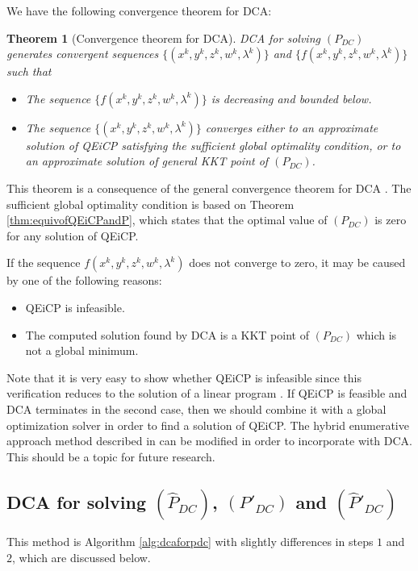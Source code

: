 \documentclass[3p]{elsarticle}
\newtheorem{thm}{Theorem}
\begin{document}
We have the following convergence theorem for DCA:
\begin{thm}[Convergence theorem for DCA]\label{thm:convergenceofdca}
	DCA for solving $(P_{DC})$ generates convergent sequences $\{(x^k,y^k,z^k,w^k,\lambda^k)\}$ and $\{f(x^k,y^k,z^k,w^k,\lambda^k)\}$ such that 
	\begin{itemize}
		\item[(i)] The sequence $\{f(x^k,y^k,z^k,w^k,\lambda^k)\}$ is decreasing and bounded below.
		\item[(ii)] The sequence $\{(x^k,y^k,z^k,w^k,\lambda^k)\}$ converges either to an approximate solution of QEiCP satisfying the sufficient global optimality condition, or to an approximate solution of general KKT point of $(P_{DC})$.
	\end{itemize}
\end{thm}
\begin{pf}
	This theorem is a consequence of the general convergence theorem for DCA \cite{Pham98,Pham05}. The sufficient global optimality condition is based on Theorem \ref{thm:equivofQEiCPandP}, which states that the optimal value of $(P_{DC})$ is zero for any solution of QEiCP.
\end{pf}
\begin{rmk}
	If the sequence $f(x^k,y^k,z^k,w^k,\lambda^k)$ does not converge to zero, it may be caused by one of the following reasons:
	\begin{itemize}
		\item[(i)] QEiCP is infeasible.
		\item[(ii)] The computed solution found by DCA is a KKT point of $(P_{DC})$ which is not a global minimum.
	\end{itemize}
	Note that it is very easy to show whether QEiCP is infeasible since this verification reduces to the solution of a linear program \cite{Cottle}. If QEiCP is feasible and DCA terminates in the second case, then we should combine it with a global optimization solver in order to find a solution of QEiCP. The hybrid enumerative approach method described in \cite{Iusem16} can be modified in order to incorporate with DCA. This should be a topic for future research.
\end{rmk}


\subsection{DCA for solving $(\hat{P}_{DC})$, $(P'_{DC})$ and $(\hat{P}'_{DC})$}
This method is Algorithm \ref{alg:dcaforpdc} with slightly differences in steps $1$ and $2$, which are discussed below.
\end{document}
